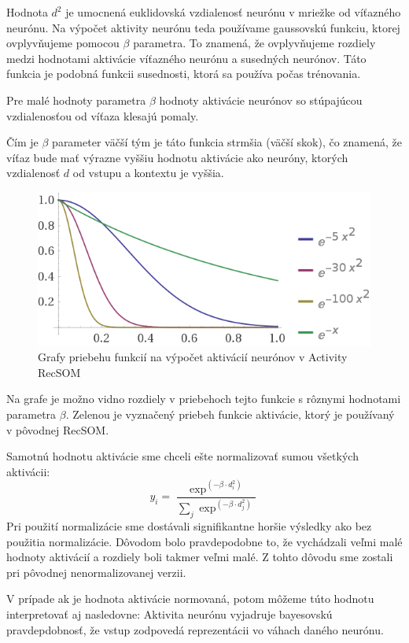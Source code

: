 Hodnota $d^2$ je umocnená euklidovská vzdialenosť neurónu v mriežke od víťazného neurónu.
Na výpočet aktivity neurónu teda používame gaussovskú funkciu, ktorej  ovplyvňujeme
pomocou $\beta$ parametra. To znamená, že ovplyvňujeme rozdiely medzi hodnotami aktivácie víťazného neurónu
a susedných neurónov. Táto funkcia je podobná funkcii susednosti, ktorá sa používa počas trénovania. 

Pre malé hodnoty parametra $\beta$ hodnoty aktivácie neurónov so stúpajúcou vzdialenosťou od víťaza
klesajú pomaly. 

Čím je $\beta$ parameter väčší tým je táto funkcia strmšia (väčší skok), čo znamená, že víťaz bude mať výrazne vyššiu hodnotu aktivácie
ako neuróny, ktorých vzdialenosť $d$ od vstupu a kontextu je vyššia.

\begin{figure}[H]
    \centering
    \includegraphics[width=\textwidth]{assets/plots}
    \caption{Grafy priebehu funkcií na výpočet aktivácií neurónov v Activity RecSOM}
\end{figure}
Na grafe je možno vidno rozdiely v priebehoch tejto funkcie s rôznymi hodnotami parametra $\beta$. Zelenou 
je vyznačený priebeh funkcie aktivácie, ktorý je používaný v pôvodnej RecSOM.

Samotnú hodnotu aktivácie sme chceli ešte normalizovať sumou všetkých aktivácii:
\begin{equation}
    y_{i} = \frac{\exp^{(-\beta \cdot d_{i}^{2})}}{\sum_{j} \exp^{(-\beta \cdot d_{j}^{2})}}
\end{equation}
Pri použití normalizácie sme dostávali signifikantne horšie výsledky
ako bez použitia normalizácie. Dôvodom bolo pravdepodobne to, že vychádzali veľmi malé
hodnoty aktivácií a rozdiely boli takmer veľmi malé. Z tohto dôvodu sme zostali 
pri pôvodnej nenormalizovanej verzii.

V prípade ak je hodnota aktivácie normovaná, potom môžeme túto
hodnotu interpretovať aj nasledovne:
Aktivita neurónu vyjadruje bayesovskú pravdepdobnosť, že vstup zodpovedá reprezentácii vo váhach daného neurónu.

